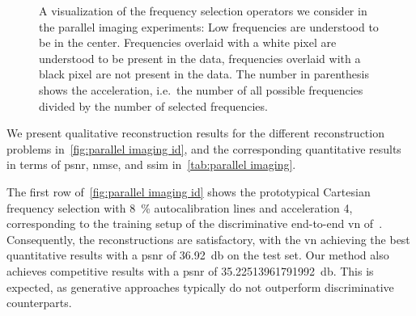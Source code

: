 \begin{figure}
	\centering
	\caption[Frequency selection in parallel imaging]{%
		A visualization of the frequency selection operators we consider in the parallel imaging experiments:
		Low frequencies are understood to be in the center.
		Frequencies overlaid with a white pixel are understood to be present in the data, frequencies overlaid with a black pixel are not present in the data.
		The number in parenthesis shows the acceleration, i.e.\ the number of all possible frequencies divided by the number of selected frequencies.
	}%
	\label{fig:parallel imaging masks}
\end{figure}

We present qualitative reconstruction results for the different reconstruction problems in~\cref{fig:parallel imaging id}, and the corresponding quantitative results in terms of \gls{psnr}, \gls{nmse}, and \gls{ssim} in~\cref{tab:parallel imaging}.

The first row of~\cref{fig:parallel imaging id} shows the prototypical Cartesian frequency selection with \qty{8}{\percent} autocalibration lines and acceleration \num{4}, corresponding to the training setup of the discriminative end-to-end \gls{vn} of~\cite{sriram_endtoend_2020}.
Consequently, the reconstructions are satisfactory, with the \gls{vn} achieving the best quantitative results with a \gls{psnr} of \qty{36.92}{\decibel} on the test set.
Our method also achieves competitive results with a \gls{psnr} of \qty[round-mode=places,round-precision=2]{35.22513961791992}{\decibel}.
This is expected, as generative approaches typically do not outperform discriminative counterparts.

